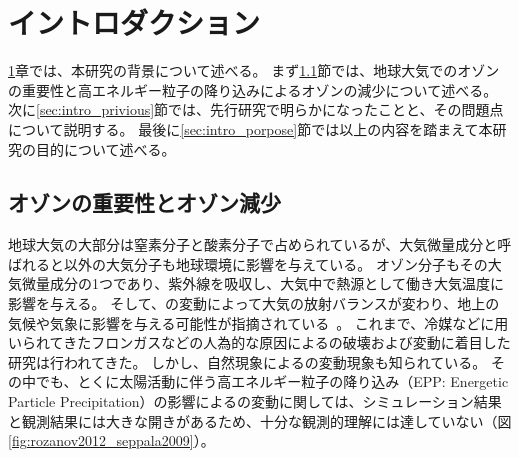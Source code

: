 \chapter{イントロダクション}
\label{ch:intro}
\ref{ch:intro}章では、本研究の背景について述べる。
まず\ref{sec:intro_background}節では、地球大気でのオゾンの重要性と高エネルギー粒子の降り込みによるオゾンの減少について述べる。
次に\ref{sec:intro_privious}節では、先行研究で明らかになったことと、その問題点について説明する。
最後に\ref{sec:intro_porpose}節では以上の内容を踏まえて本研究の目的について述べる。


\section{オゾンの重要性とオゾン減少}
\label{sec:intro_background}
地球大気の大部分は窒素分子と酸素分子で占められているが、大気微量成分と呼ばれると以外の大気分子も地球環境に影響を与えている。
オゾン分子もその大気微量成分の1つであり、紫外線を吸収し、大気中で熱源として働き大気温度に影響を与える。
そして、の変動によって大気の放射バランスが変わり、地上の気候や気象に影響を与える可能性が指摘されている~\cite{rozanov2012influence,seppala2009geomagnetic}。
これまで、冷媒などに用いられてきたフロンガスなどの人為的な原因によるの破壊および変動に着目した研究は行われてきた。
しかし、自然現象によるの変動現象も知られている。
その中でも、とくに太陽活動に伴う高エネルギー粒子の降り込み（EPP: Energetic Particle Precipitation）の影響によるの変動に関しては、シミュレーション結果と観測結果には大きな開きがあるため、十分な観測的理解には達していない（図\ref{fig:rozanov2012_seppala2009}）。\par

